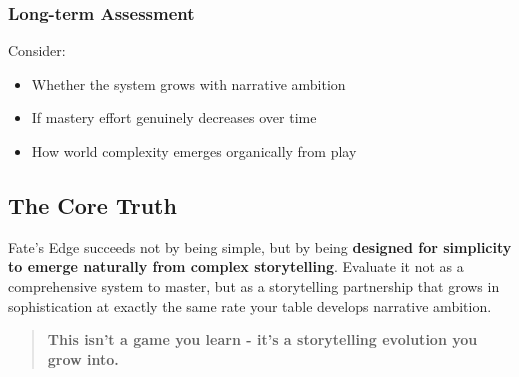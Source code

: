 \subsubsection{Long-term Assessment}
Consider:
\begin{itemize}
    \item Whether the system grows with narrative ambition
    \item If mastery effort genuinely decreases over time
    \item How world complexity emerges organically from play
\end{itemize}

\subsection{The Core Truth}

Fate's Edge succeeds not by being simple, but by being \textbf{designed for simplicity to emerge naturally from complex storytelling}. Evaluate it not as a comprehensive system to master, but as a storytelling partnership that grows in sophistication at exactly the same rate your table develops narrative ambition.

\begin{quote}
\textbf{This isn't a game you learn - it's a storytelling evolution you grow into.}
\end{quote}
